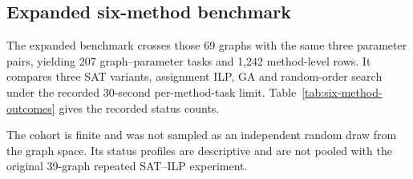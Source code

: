 \subsection{Expanded six-method benchmark}
The expanded benchmark crosses those 69 graphs with the same three
parameter pairs, yielding 207 graph--parameter tasks and 1,242
method-level rows. It compares three SAT variants, assignment ILP, GA and
random-order search under the recorded 30-second per-method-task limit.
Table~\ref{tab:six-method-outcomes} gives the recorded status counts.
\begin{table}[htbp]
\centering\small
\caption{Recorded outcomes in the six-method benchmark.}
\label{tab:six-method-outcomes}

\end{table}
The cohort is finite and was not sampled as an independent random draw
from the graph space. Its status profiles are descriptive and are not
pooled with the original 39-graph repeated SAT--ILP experiment.

